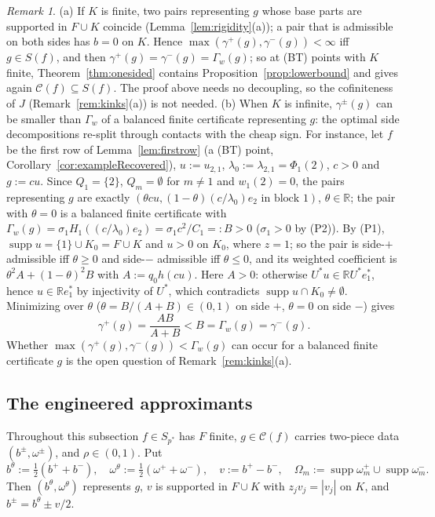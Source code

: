 \documentclass[10pt]{amsart}
\theoremstyle{definition}
\theoremstyle{remark}
\newtheorem{remark}[theorem]{Remark}
\newcommand{\supp}{\operatorname{supp}}
\newcommand{\R}{\mathbb R}
\newcommand{\Cset}{\mathcal C}
\begin{document}
\begin{remark}\label{rem:onesided}
(a) If $K$ is finite, two pairs representing $g$ whose base parts are
supported in $F\cup K$ coincide (Lemma~\ref{lem:rigidity}(a)); a pair that
is admissible on both sides has $b=0$ on $K$.  Hence
$\max(\gamma^+(g),\gamma^-(g))<\infty$ iff $g\in S(f)$, and then
$\gamma^+(g)=\gamma^-(g)=\Gamma_w(g)$; so at \textup{(BT)} points with $K$ finite,
Theorem~\ref{thm:onesided} contains Proposition~\ref{prop:lowerbound} and
gives again $\Cset(f)\subseteq S(f)$.  The
proof above needs no decoupling, so the cofiniteness of $J$
(Remark~\ref{rem:kinks}(a)) is not needed.
(b) When $K$ is infinite, $\gamma^\pm(g)$ can be smaller than $\Gamma_w$ of
a balanced finite certificate representing $g$: the optimal side
decompositions re-split through contacts with the cheap sign.  For
instance, let $f$ be the first row of Lemma~\ref{lem:firstrow} (a
\textup{(BT)} point, Corollary~\ref{cor:exampleRecovered}), $u:=u_{2,1}$,
$\lambda_0:=\lambda_{2,1}=\Phi_1(2)$, $c>0$ and $g:=cu$.  Since $Q_1=\{2\}$,
$Q_m=\emptyset$ for $m\ne1$ and $w_1(2)=0$, the pairs representing $g$ are
exactly $(\theta cu,(1-\theta)(c/\lambda_0)e_2\text{ in block }1)$,
$\theta\in\R$; the pair with $\theta=0$ is a balanced finite certificate
with $\Gamma_w(g)=\sigma_1H_1((c/\lambda_0)e_2)=\sigma_1c^2/C_1=:B>0$
($\sigma_1>0$ by (P2)).  By (P1), $\supp u=\{1\}\cup K_0=F\cup K$ and $u>0$
on $K_0$, where $z=1$; so the pair is side-$+$ admissible iff $\theta\ge0$
and side-$-$ admissible iff $\theta\le0$, and its weighted coefficient is
$\theta^2A+(1-\theta)^2B$ with $A:=q_0h(cu)$.  Here $A>0$: otherwise
$U^*u\in\R U^*e_1^*$, hence $u\in\R e_1^*$ by injectivity of $U^*$, which
contradicts $\supp u\cap K_0\ne\emptyset$.  Minimizing over $\theta$
($\theta=B/(A+B)\in(0,1)$ on side $+$, $\theta=0$ on side $-$) gives
\[
 \gamma^+(g)=\frac{AB}{A+B}<B=\Gamma_w(g)=\gamma^-(g).
\]
Whether $\max(\gamma^+(g),\gamma^-(g))<\Gamma_w(g)$ can occur for a
balanced finite certificate $g$ is the open question of
Remark~\ref{rem:kinks}(a).
\end{remark}

\subsection{The engineered approximants}
Throughout this subsection $f\in S_{p^*}$ has $F$ finite, $g\in\Cset(f)$
carries two-piece data $(b^\pm,\omega^\pm)$, and $\rho\in(0,1)$.  Put
\[
 b^\theta:=\tfrac12(b^++b^-),\quad \omega^\theta:=\tfrac12(\omega^++\omega^-),
 \quad v:=b^+-b^-,\quad \Omega_m:=\supp\omega^+_m\cup\supp\omega^-_m .
\]
Then $(b^\theta,\omega^\theta)$ represents $g$, $v$ is supported in $F\cup
K$ with $z_jv_j=|v_j|$ on $K$, and $b^\pm=b^\theta\pm v/2$.
\end{document}
